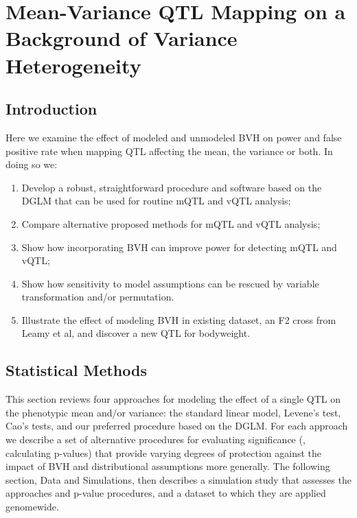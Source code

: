 \chapter{Mean-Variance QTL Mapping on a Background of Variance Heterogeneity}
\label{chap:bvh}

\section{Introduction}

Here we examine the effect of modeled and unmodeled BVH on power and false positive rate when mapping QTL affecting the mean, the variance or both.
In doing so we:
\begin{enumerate}
\item Develop a robust, straightforward procedure and software based on the DGLM that can be used for routine mQTL and vQTL analysis;
\item Compare alternative proposed methods for mQTL and vQTL analysis;
\item Show how incorporating BVH can improve power for detecting mQTL and vQTL;
\item Show how sensitivity to model assumptions can be rescued by variable transformation and/or permutation. 
\item Illustrate the effect of modeling BVH in existing dataset, an F2 cross from Leamy et al, and discover a new QTL for bodyweight.
\end{enumerate}

\section{Statistical Methods}

This section reviews four approaches for modeling the effect of a single QTL on the phenotypic mean and/or variance: the standard linear model, Levene's test, Cao's tests, and our preferred procedure based on the DGLM. For each approach we describe a set of alternative procedures for evaluating significance (\ie, calculating p-values) that provide varying degrees of protection against the impact of BVH and distributional assumptions more generally. 
The following section, Data and Simulations, then describes a simulation study that assesses the approaches and p-value procedures, and a dataset to which they are applied genomewide.

